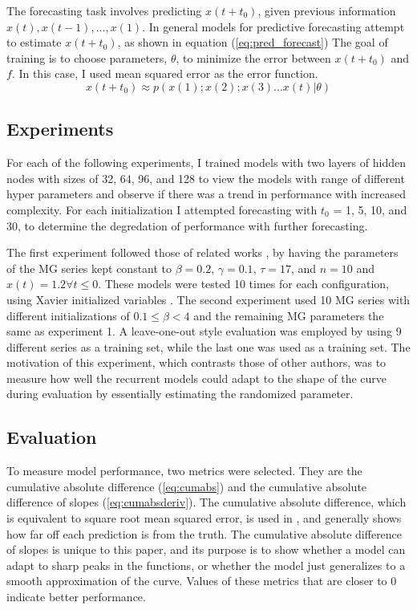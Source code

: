 \documentclass[11pt]{article}
\begin{document}
The forecasting task involves predicting $x(t+t_0)$, given previous
information $x(t), x(t-1), ..., x(1)$. In general models for predictive forecasting
attempt to estimate $x(t+t_0)$, as shown in equation
(\ref{eq:pred_forecast}) The goal of training is to 
choose parameters, $\theta$, to minimize the error between $x(t+t_0)$
and $f$. In this case, I used mean squared error as the error function.
\begin{equation}
  x(t+t_0) \approx p(x(1);x(2);x(3)...x(t) | \theta)
  \label{eq:pred_forecast}
\end{equation}

\subsection{Experiments}
For each of the following
experiments, I
trained models with two layers of hidden nodes with sizes of 32, 64, 96, and 128 to
view the models with range of different hyper parameters and observe if
there was a trend in performance with increased complexity. For each
initialization I attempted forecasting with $t_0$ = 1, 5, 10, and 30,
to determine the degredation of performance with further forecasting.

The first experiment followed those of related works \cite{tr, Farsa},
by having the
parameters of the MG series kept constant to $\beta = 0.2$,
$\gamma = 0.1$, $\tau = 17$, and $n = 10$ and $x(t)=1.2  \forall  t \leq 0$. These models were tested 10 times for each configuration, using Xavier initialized variables \cite{Xavier}. The second experiment used 10 MG series with different
initializations of $0.1 \leq \beta < 4$ and the remaining MG parameters the same as experiment 1. A leave-one-out style evaluation was employed by using 9 different series as a training
set, while the last one was used as a training set. The motivation of
this experiment, which contrasts those of other authors, was to measure
how well the recurrent models could adapt to the shape of the curve during
evaluation by essentially estimating the randomized parameter.

\subsection{Evaluation}
\label{sec-3-3}
To measure model performance, two metrics were selected. They are
the cumulative absolute difference (\ref{eq:cumabs}) and the
cumulative absolute difference of slopes
(\ref{eq:cumabsderiv}). The cumulative absolute difference, which is
equivalent to square root mean squared error, is used 
in \cite{Farsa}, and generally shows how far off each prediction
is from the truth. The cumulative absolute difference of slopes is
unique to this paper, and its purpose is to show whether a model can
adapt to sharp peaks in the functions, or whether the model just
generalizes to a smooth approximation of the curve. Values of these metrics that are closer to 0 indicate better performance.
\end{document}
